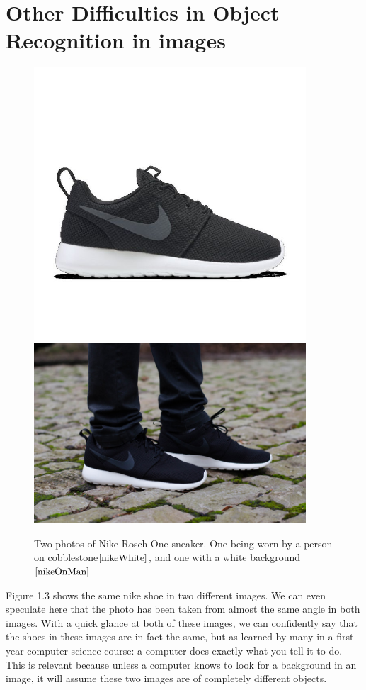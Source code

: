\documentclass[12pt]{report} %
\begin{document}
\section{Other Difficulties in Object Recognition in images}
\begin{figure}
\centering
\includegraphics[width=4in]{nike} 
\centering
\includegraphics[width=4in]{nike_on_man} 
\caption{Two photos of Nike Rosch One sneaker. One being worn by a person on cobblestone$\cite{nikeWhite}$, and one with a white background$\cite{nikeOnMan}$}
\end{figure}
	
	Figure 1.3 shows the same nike shoe in two different images. We can even speculate here that the photo has been taken from almost the same angle in both images. With a quick glance at both of these images, we can confidently say that the shoes in these images are in fact the same, but as learned by many in a first year computer science course: a computer does exactly what you tell it to do. This is relevant because unless a computer knows to look for a background in an image, it will assume these two images are of completely different objects. 
\end{document}
